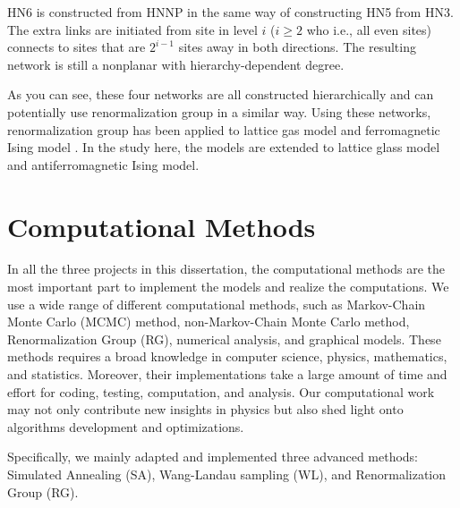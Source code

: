 HN6 \cite{Boettcher09c} is constructed from HNNP in the same way of constructing HN5 from HN3. The extra links are initiated from site in level $i$ ($i\ge2$ who
i.e., all even sites)  connects to sites that are $2^{i-1}$
sites away in both directions. The resulting network is still a nonplanar with hierarchy-dependent degree.

As you can see, these four networks are all constructed hierarchically and can potentially use renormalization group in a similar way. Using these networks, renormalization group has been applied to lattice gas model \cite{cheng2015jamming, BoHa11} and ferromagnetic Ising model \cite{Boettcher2011HNNP, boettcher2015classification}. In the study here, the models are extended to lattice glass model and antiferromagnetic Ising model. 




\section{Computational Methods}
\label{sec:intro-comp}
In all the three projects in this dissertation, the computational methods are the most important part to implement the models and realize the computations. We use a wide range of different computational methods, such as Markov-Chain Monte Carlo (MCMC) method, non-Markov-Chain Monte Carlo method, Renormalization Group (RG), numerical analysis, and graphical models.
 These methods requires a broad knowledge in computer science, physics, mathematics, and statistics. Moreover, their implementations take a large amount of time and effort for coding,  testing, computation, and analysis. Our computational work may not only contribute new insights in physics but also shed light onto algorithms development and optimizations.

Specifically, we mainly adapted and implemented three advanced methods: Simulated Annealing (SA), Wang-Landau sampling (WL), and Renormalization Group (RG). 

